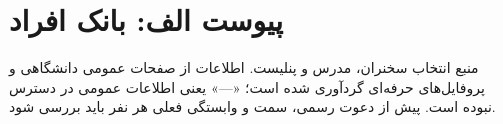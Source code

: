 \documentclass[a4paper,12pt]{article}
\begin{document}
	
	

	\newpage
	\section*{پیوست الف: بانک افراد}

	{\small\color{mci-gray}
	منبع انتخاب سخنران، مدرس و پنلیست. اطلاعات از صفحات عمومی دانشگاهی و پروفایل‌های حرفه‌ای گردآوری شده است؛
	«---» یعنی اطلاعات عمومی در دسترس نبوده است. پیش از دعوت رسمی، سمت و وابستگی فعلی هر نفر باید بررسی شود.}

	\vspace{4pt}
\end{document}
